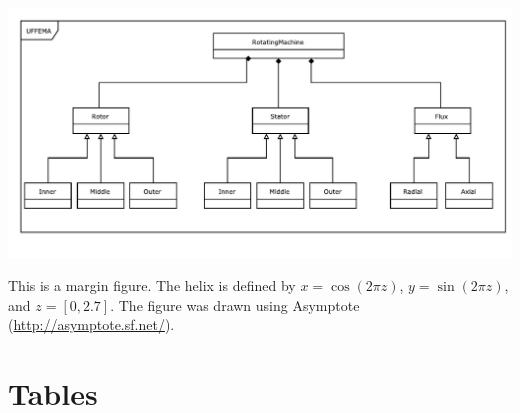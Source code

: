 \documentclass[justified]{tufte-book} %
\begin{document}
\lipsum[1] 

\begin{marginfigure}
\includegraphics[width=\linewidth]{Overview.pdf}
\caption{This is a margin figure. The helix is defined by $x = \cos(2\pi z)$, $y = \sin(2\pi z)$, and $z = [0, 2.7]$. The figure was drawn using Asymptote (\url{http://asymptote.sf.net/}).}
\label{fig:marginfig}
\end{marginfigure}

\lipsum[2]



\lipsum[3]


\section{Tables} 

\lipsum[4]
\end{document}
